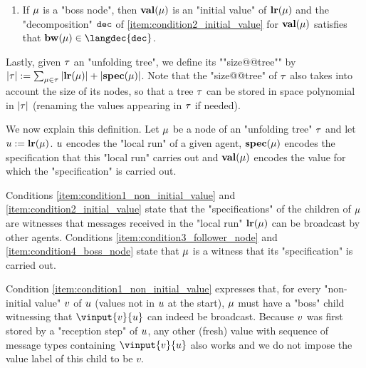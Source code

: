 \begin{definition}
\begin{enumerate}[label= (\roman*), ref=(\roman*)]
	\item \label{item:condition4_boss_node} If $\mu$ is a "boss node", then $\mathbf{val}(\mu)$ is an "initial value" of $\mathbf{lr}(\mu)$ and the "decomposition" $\mathtt{dec}$ of \ref{item:condition2_initial_value} for $\mathbf{val}(\mu)$ satisfies that $\bosslabel{\node} \in \langdec{\decsymb}$.
\end{enumerate}

\AP Lastly, given $\tau$ an "unfolding tree", we define its ""size@@tree"" by $|\tau| := \sum_{\mu \in \tau} |\mathbf{lr}(\mu)| + |\mathbf{spec}(\mu)|$. Note that the "size@@tree" of $\tau$ also takes into account the size of its nodes, so that a tree $\tau$ can be stored in space polynomial in $|\tau|$ (renaming the values appearing in $\tau$ if needed). 
\end{definition}

We now explain this definition. Let $\mu$ be a node of an "unfolding tree" $\tau$ and let $u := \mathbf{lr}(\mu)$. $u$ encodes the "local run" of a given agent, $\mathbf{spec}(\mu)$ encodes the specification that this "local run" carries out and $\mathbf{val}(\mu)$ encodes the value for which the "specification" is carried out.

Conditions \ref{item:condition1_non_initial_value} and \ref{item:condition2_initial_value} state that the "specifications" of the children of $\mu$ are witnesses that messages received in the "local run" $\mathbf{lr}(\mu)$ can be broadcast by other agents. Conditions \ref{item:condition3_follower_node} and \ref{item:condition4_boss_node} state that $\mu$ is a witness that its "specification" is carried out. 

Condition \ref{item:condition1_non_initial_value} expresses that, for every "non-initial value" $v$ of $u$ (values not in $u$ at the start), $\mu$ must have a "boss" child witnessing that $\vinput{v}{\localrun}$ can indeed be broadcast. Because $v$ was first stored by a "reception step" of $u$, any other (fresh) value with sequence of message types containing $\vinput{v}{\localrun}$ also works and we do not impose the value label of this child to be $v$. 

